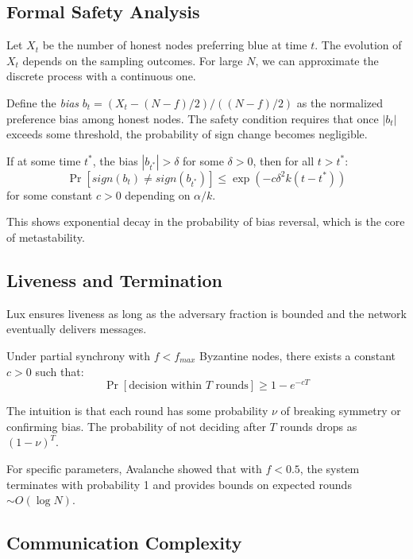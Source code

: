 \subsection{Formal Safety Analysis}

Let $X_t$ be the number of honest nodes preferring blue at time $t$. The evolution of $X_t$ depends on the sampling outcomes. For large $N$, we can approximate the discrete process with a continuous one.

Define the \emph{bias} $b_t = (X_t - (N-f)/2)/((N-f)/2)$ as the normalized preference bias among honest nodes. The safety condition requires that once $|b_t|$ exceeds some threshold, the probability of sign change becomes negligible.

\begin{lemma}
If at some time $t^*$, the bias $|b_{t^*}| > \delta$ for some $\delta > 0$, then for all $t > t^*$:
$$\Pr[sign(b_t) \neq sign(b_{t^*})] \leq \exp(-c\delta^2 k (t-t^*))$$
for some constant $c > 0$ depending on $\alpha/k$.
\end{lemma}

This shows exponential decay in the probability of bias reversal, which is the core of metastability.

\subsection{Liveness and Termination}

Lux ensures liveness as long as the adversary fraction is bounded and the network eventually delivers messages.

\begin{theorem}
Under partial synchrony with $f < f_{max}$ Byzantine nodes, there exists a constant $c > 0$ such that:
$$\Pr[\text{decision within } T \text{ rounds}] \geq 1 - e^{-cT}$$
\end{theorem}

The intuition is that each round has some probability $\nu$ of breaking symmetry or confirming bias. The probability of not deciding after $T$ rounds drops as $(1-\nu)^T$.

For specific parameters, Avalanche showed that with $f < 0.5$, the system terminates with probability 1 and provides bounds on expected rounds $\sim O(\log N)$.

\subsection{Communication Complexity}

